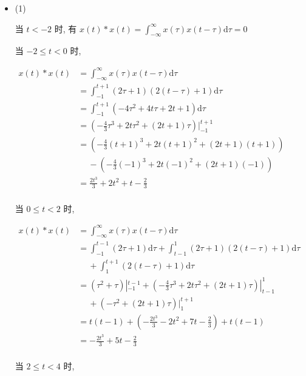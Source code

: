 \documentclass[a4paper,UTF8]{article}
\numberwithin{equation}{section}
\begin{document}
\begin{framed}
\begin{spacing}{1.5}
    \begin{itemize}
      \item (1)

      当 $t < -2$ 时, 有 $\displaystyle x(t) * x(t) = \int_{-\infty}^{\infty}x(\tau)x(t-\tau)\mathrm{d}\tau = 0$
      
      当 $-2 \le t < 0$ 时, 
      
      $
      \begin{aligned}
      x(t) * x(t) &= \int_{-\infty}^{\infty}x(\tau)x(t-\tau)\mathrm{d}\tau  \\
      &= \int_{-1}^{t+1}(2\tau+1)(2(t-\tau)+1)\mathrm{d}\tau  \\
      &= \int_{-1}^{t+1}(- 4 \tau^{2} + 4 t \tau + 2 t + 1)\mathrm{d}\tau  \\
      &= (- \frac{4}{3} \tau^{3} + 2 t \tau^{2} + (2 t + 1)\tau)|_{-1}^{t+1}  \\
      &= (- \frac{4}{3} (t+1)^{3} + 2 t (t+1)^{2} + (2 t + 1)(t+1)) \\
      &\quad\ - (- \frac{4}{3} (-1)^{3} + 2 t (-1)^{2} + (2 t + 1)(-1))  \\
      &= \frac{2 t^{3}}{3} + 2 t^{2} + t - \frac{2}{3}  \\
      \end{aligned}
      $
      
      当 $0 \le t < 2$ 时,
      
      $
      \begin{aligned}
      x(t) * x(t) &= \int_{-\infty}^{\infty}x(\tau)x(t-\tau)\mathrm{d}\tau  \\
      &= \int_{-1}^{t-1}(2\tau+1)\mathrm{d}\tau + \int_{t-1}^{1}(2\tau+1)(2(t-\tau)+1)\mathrm{d}\tau \\
      &\quad\ + \int_{1}^{t+1}(2(t-\tau)+1)\mathrm{d}\tau  \\
      &= (\tau^{2}+\tau)|_{-1}^{t-1} + (- \frac{4}{3} \tau^{3} + 2 t \tau^{2} + (2 t + 1)\tau)|_{t-1}^{1} \\
      &\quad\ + (-\tau^{2} + (2 t+1)\tau)|_{1}^{t+1}  \\
      &= t (t - 1) + (- \frac{2 t^{3}}{3} - 2 t^{2} + 7 t - \frac{2}{3}) + t (t - 1) \\
      &= - \frac{2 t^{3}}{3} + 5 t - \frac{2}{3} \\
      \end{aligned}
      $
      
      当 $2 \le t < 4$ 时,
      

\end{itemize}
\end{spacing}
\end{framed}
\end{document}
